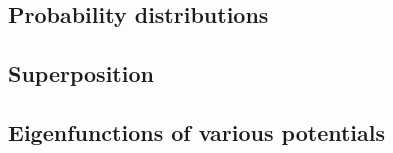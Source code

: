 \subsection{Probability distributions}
\subsection{Superposition}
\subsection{Eigenfunctions of various potentials}
